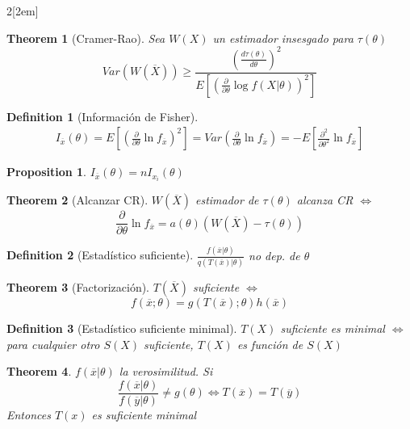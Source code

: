 \documentclass[leqno]{article}
\newtheorem*{theorem}{Theorem}
\newtheorem*{proposition}{Proposition}
\newtheorem*{definition}{Definition}
\begin{document}
\begin{multicols}{2}[\columnsep2em]
\begin{theorem}[Cramer-Rao] Sea $W(X)$ un estimador insesgado para $\tau (\theta )$
  \[
	Var(W(\overline{X}))\ge \frac{\left(\frac{d \tau (\theta )}{d \theta } \right)^2}{E\left[ \left( \frac{\partial}{\partial\theta } \log f(X|\theta ) \right)^2 \right]}
  \] 
\end{theorem}

\begin{definition}[Información de Fisher]
  \begin{align*}
  I_{\overline{x}}(\theta ) = E\left[ \left(  \frac{\partial}{\partial \theta } \ln f_{\overline{x}} \right) ^2 \right]  = Var\left(\frac{\partial}{\partial \theta }\ln f_{\overline{x}}\right) =  -E\left[  \frac{\partial^2}{\partial \theta ^2} \ln f_{\overline{x}} \right]
  \end{align*}
\end{definition}

\begin{proposition} $I_{\overline{x}}(\theta ) = nI_{x_i}(\theta )$
\end{proposition}

\begin{theorem}[Alcanzar CR] $W(\overline{X})$ estimador de $\tau (\theta )$ alcanza CR  $\iff$
\[
\frac{\partial}{\partial \theta } \ln f_{\overline{x}} = a(\theta )(W(\overline{X})-\tau (\theta ))
\] 
\end{theorem}

\begin{definition}[Estadístico suficiente] $\frac{f(\overline{x}|\theta )}{q(T(\overline{x})|\theta )}$ no dep. de $\theta $
\end{definition}

\begin{theorem}[Factorización] $T(\overline{X})$ suficiente $\iff$ 
\[
f(\overline{x}; \theta ) = g(T(\overline{x});\theta )h(\overline{x})
\] 
\end{theorem}

\begin{definition}[Estadístico suficiente minimal] $T(X)$ suficiente es minimal  $\iff$ para cualquier otro $S(X)$ suficiente,  $T(X)$ es función de $S(X)$ 
\end{definition}

\begin{theorem} $f(\overline{x}|\theta )$ la verosimilitud. Si 
  \[
  \frac{f(\overline{x}|\theta  )}{f(\overline{y}|\theta)} \neq g(\theta ) \iff T(\overline{x}) = T(\overline{y})
  \] 
  Entonces $T(x)$ es suficiente minimal
\end{theorem}


\end{multicols}
\end{document}
